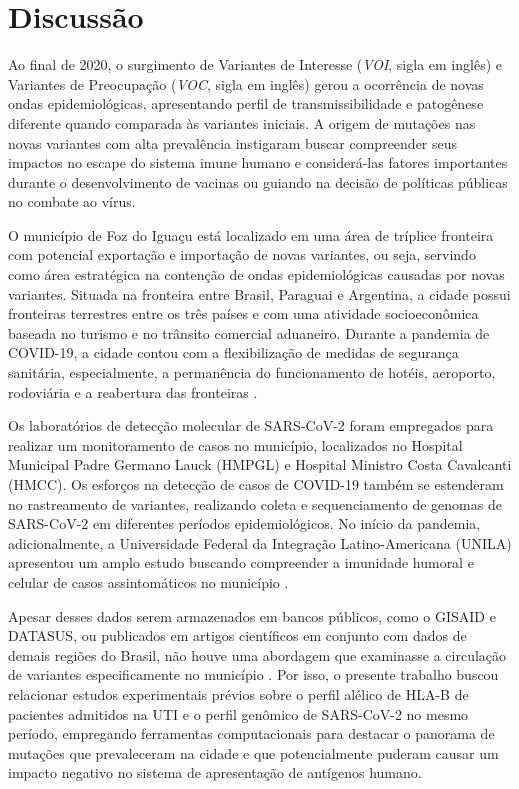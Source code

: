\chapter*{Discussão}

\begin{justifying}

Ao final de 2020, o surgimento de Variantes de Interesse (\textit{VOI}, sigla em inglês) e Variantes de Preocupação (\textit{VOC}, sigla em inglês) gerou a ocorrência de novas ondas epidemiológicas, apresentando perfil de transmissibilidade e patogênese diferente quando comparada às variantes iniciais. A origem de mutações nas novas variantes com alta prevalência instigaram buscar compreender seus impactos no escape do sistema imune humano e considerá-las fatores importantes durante o desenvolvimento de vacinas ou guiando na decisão de políticas públicas no combate ao vírus.	

O município  de Foz do Iguaçu está localizado em uma área de tríplice fronteira com potencial exportação e importação de novas variantes, ou seja, servindo como área estratégica na contenção de ondas epidemiológicas causadas por novas variantes. Situada na fronteira entre Brasil, Paraguai e Argentina, a cidade possui fronteiras terrestres entre os três países e com uma atividade socioeconômica baseada no turismo e no trânsito comercial aduaneiro. Durante a pandemia de COVID-19, a cidade contou com a flexibilização de medidas de segurança sanitária, especialmente, a permanência do funcionamento de hotéis, aeroporto, rodoviária e a reabertura das fronteiras \cite{Rivas:2020}. 

Os laboratórios de detecção molecular de SARS-CoV-2 foram empregados para realizar um monitoramento de casos no município, localizados no Hospital Municipal Padre Germano Lauck (HMPGL) e Hospital Ministro Costa Cavalcanti (HMCC). Os esforços na detecção de casos de COVID-19 também se estenderam no rastreamento de variantes, realizando coleta e sequenciamento de genomas de SARS-CoV-2 em diferentes períodos epidemiológicos. No início da pandemia, adicionalmente, a Universidade Federal da Integração Latino-Americana (UNILA) apresentou um amplo estudo buscando compreender a imunidade humoral e celular de casos assintomáticos no município \cite{Viana:2021}. 

Apesar desses dados serem armazenados em bancos públicos, como o GISAID e DATASUS,  ou publicados em artigos científicos em conjunto com dados de demais regiões do Brasil, não houve uma abordagem que examinasse  a circulação de variantes especificamente no município \cite{Giovanetti:2022}. Por isso, o presente trabalho buscou relacionar estudos experimentais prévios sobre o perfil alélico de HLA-B de pacientes admitidos na UTI e o perfil genômico de SARS-CoV-2 no mesmo período, empregando ferramentas computacionais para destacar o panorama de mutações que prevaleceram na cidade e que potencialmente puderam causar um impacto negativo no sistema de apresentação de antígenos humano.


\end{justifying}
